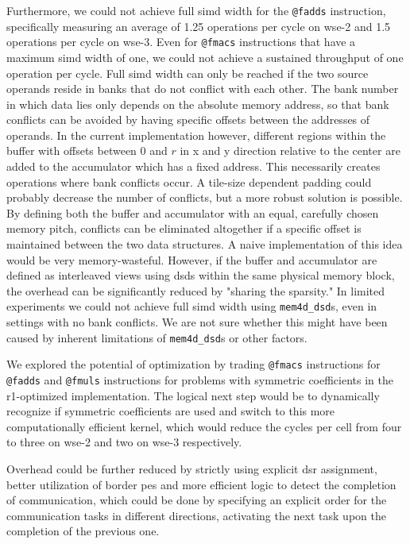 Furthermore, we could not achieve full \ac{simd} width for the \texttt{@fadds} instruction, specifically measuring an average of 1.25 operations per cycle on \ac{wse}-2 and 1.5 operations per cycle on \ac{wse}-3. Even for \texttt{@fmacs} instructions that have a maximum \ac{simd} width of one, we could not achieve a sustained throughput of one operation per cycle. Full \ac{simd} width can only be reached if the two source operands reside in banks that do not conflict with each other. The bank number in which data lies only depends on the absolute memory address, so that bank conflicts can be avoided by having specific offsets between the addresses of operands. In the current implementation however, different regions within the buffer with offsets between 0 and $r$ in x and y direction relative to the center are added to the accumulator which has a fixed address.
This necessarily creates operations where bank conflicts occur.
A tile-size dependent padding could probably decrease the number of conflicts, but a more robust solution is possible.
By defining both the buffer and accumulator with an equal, carefully chosen memory pitch, conflicts can be eliminated altogether if a specific offset is maintained between the two data structures.
A naive implementation of this idea would be very memory-wasteful.
However, if the buffer and accumulator are defined as interleaved views using \acp{dsd} within the same physical memory block, the overhead can be significantly reduced by "sharing the sparsity."
In limited experiments we could not achieve  full \ac{simd} width using \texttt{mem4d\_dsd}s, even in settings with no bank conflicts. We are not sure whether this might have been caused by inherent limitations of \texttt{mem4d\_dsd}s or other factors.

We explored the potential of optimization by trading \texttt{@fmacs} instructions for \texttt{@fadds} and \texttt{@fmuls} instructions for problems with symmetric coefficients in the r1-optimized implementation. The logical next step would be to dynamically recognize if symmetric coefficients are used and switch to  this more computationally efficient kernel, which would reduce the cycles per cell from four to three on \ac{wse}-2 and two on \ac{wse}-3 respectively.

Overhead could be further reduced by strictly using explicit \ac{dsr} assignment, better utilization of border \acp{pe} and more efficient logic to detect the completion of communication, which could be done by specifying an explicit order for the communication tasks in different directions, activating the next task upon the completion of the previous one.

